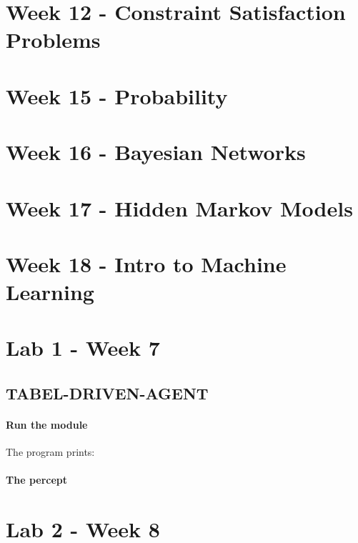 \documentclass{article}
\begin{document}
\newpage
\section{Week 12 - Constraint Satisfaction Problems}%
\label{sec:23_march_constraint_satisfaction_problems}



\newpage
\section{Week 15 - Probability}%
\label{sec:12_march_probability}

\newpage
\section{Week 16 - Bayesian Networks}%
\label{sec:20_march_bayesian_networks}

\newpage
\section{Week 17 - Hidden Markov Models}%
\label{sec:27_march_hidden_markov_models}

\newpage
\section{Week 18 - Intro to Machine Learning}%
\label{sec:}

\newpage
\section{Lab 1 - Week 7}%
\label{sec:lab_week_7}

\subsection{TABEL-DRIVEN-AGENT}%
\label{sub:tabel_driven_agent}

\paragraph{Run the module}
The program prints:

\paragraph{The percept }

\newpage
\section{Lab 2 - Week 8}%
\label{sec:lab_week_8}
\end{document}
